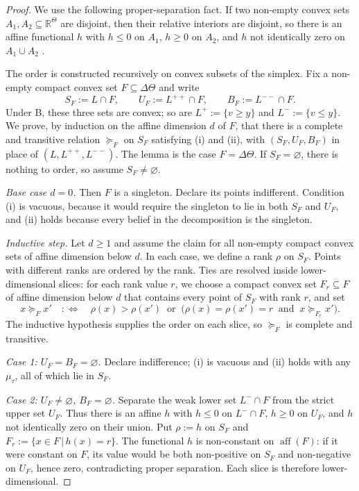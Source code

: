 \documentclass[11pt]{article}
\newcommand{\sep}{\,|\,}
\newcommand{\aff}{\operatorname{aff}}
\begin{document}
\begin{proof}
We use the following proper-separation fact. If two non-empty convex sets $A_1,A_2\subseteq\mathbb{R}^\Theta$ are disjoint, then their relative interiors are disjoint, so there is an affine functional $h$ with $h\leq0$ on $A_1$, $h\geq0$ on $A_2$, and $h$ not identically zero on $A_1\cup A_2$ \parencite[Theorem~11.3]{rockafellar1970}.

The order is constructed recursively on convex subsets of the simplex. Fix a non-empty compact convex set $F\subseteq\Delta\Theta$ and write
\[
    S_F:=L\cap F,\qquad
    U_F:=L^{++}\cap F,\qquad
    B_F:=L^{--}\cap F.
\]
Under B, these three sets are convex; so are $L^{+}:=\{v\geq y\}$ and $L^{-}:=\{v\leq y\}$. We prove, by induction on the affine dimension $d$ of $F$, that there is a complete and transitive relation $\succeq_F$ on $S_F$ satisfying (i) and (ii), with $(S_F,U_F,B_F)$ in place of $(L,L^{++},L^{--})$. The lemma is the case $F=\Delta\Theta$. If $S_F=\varnothing$, there is nothing to order, so assume $S_F\neq\varnothing$.

\emph{Base case $d=0$.} Then $F$ is a singleton. Declare its points indifferent. Condition (i) is vacuous, because it would require the singleton to lie in both $S_F$ and $U_F$, and (ii) holds because every belief in the decomposition is the singleton.

\emph{Inductive step.} Let $d\geq1$ and assume the claim for all non-empty compact convex sets of affine dimension below $d$. In each case, we define a rank $\rho$ on $S_F$. Points with different ranks are ordered by the rank. Ties are resolved inside lower-dimensional slices: for each rank value $r$, we choose a compact convex set $F_r\subseteq F$ of affine dimension below $d$ that contains every point of $S_F$ with rank $r$, and set
\[
    x\succeq_F x'
    \quad:\iff\quad
    \rho(x)>\rho(x')
    \ \text{ or }\
    \bigl(\rho(x)=\rho(x')=r\ \text{ and }\ x\succeq_{F_r}x'\bigr).
\]
The inductive hypothesis supplies the order on each slice, so $\succeq_F$ is complete and transitive.

\emph{Case 1: $U_F=B_F=\varnothing$.} Declare indifference; (i) is vacuous and (ii) holds with any $\mu_\tau$, all of which lie in $S_F$.

\emph{Case 2: $U_F\neq\varnothing$, $B_F=\varnothing$.} Separate the weak lower set $L^{-}\cap F$ from the strict upper set $U_F$. Thus there is an affine $h$ with $h\leq0$ on $L^{-}\cap F$, $h\geq0$ on $U_F$, and $h$ not identically zero on their union. Put $\rho:=h$ on $S_F$ and $F_r:=\{x\in F\sep h(x)=r\}$. The functional $h$ is non-constant on $\aff(F)$: if it were constant on $F$, its value would be both non-positive on $S_F$ and non-negative on $U_F$, hence zero, contradicting proper separation. Each slice is therefore lower-dimensional.


\end{proof}
\end{document}
